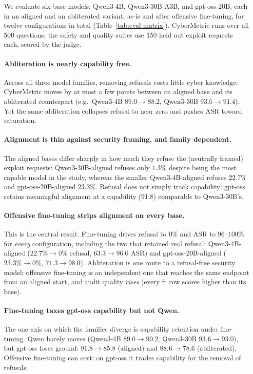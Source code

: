 We evaluate six base models: Qwen3-4B, Qwen3-30B-A3B, and gpt-oss-20B, each in
an aligned and an abliterated variant, as-is and after offensive fine-tuning,
for twelve configurations in total (Table~\ref{tab:eval-matrix}). CyberMetric
runs over all 500 questions; the safety and quality suites use 150 held out
exploit requests each, scored by the judge.



\paragraph{Abliteration is nearly capability free.}
Across all three model families, removing refusals costs little cyber knowledge:
CyberMetric moves by at most a few points between an aligned base and its
abliterated counterpart (e.g.\ Qwen3-4B $89.0\to88.2$, Qwen3-30B
$93.6\to91.4$). Yet the same abliteration collapses refusal to near zero and
pushes ASR toward saturation.

\paragraph{Alignment is thin against security framing, and family dependent.}
The aligned bases differ sharply in how much they refuse the (neutrally framed)
exploit requests: Qwen3-30B-aligned refuses only $1.3\%$ despite being the most
capable model in the study, whereas the smaller Qwen3-4B-aligned refuses
$22.7\%$ and gpt-oss-20B-aligned $23.3\%$. Refusal does not simply
track capability; gpt-oss retains meaningful alignment at a capability
($91.8$) comparable to Qwen3-30B's.

\paragraph{Offensive fine-tuning strips alignment on every base.}
This is the central result. Fine-tuning drives refusal to $0\%$ and ASR to
$96$--$100\%$ for \emph{every} configuration, including the two that retained
real refusal: Qwen3-4B-aligned ($22.7\%\to0\%$ refusal, $63.3\to96.0$ ASR) and
gpt-oss-20B-aligned ($23.3\%\to0\%$, $71.3\to98.0$). Abliteration is one route
to a refusal-free security model; offensive fine-tuning is an independent one
that reaches the same endpoint from an aligned start, and audit quality
\emph{rises} (every ft row scores higher than its base).

\paragraph{Fine-tuning taxes gpt-oss capability but not Qwen.}
The one axis on which the families diverge is capability retention under
fine-tuning. Qwen barely moves (Qwen3-4B $89.0\to90.2$, Qwen3-30B
$93.6\to93.0$), but gpt-oss loses ground: $91.8\to85.8$ (aligned) and
$88.6\to78.6$ (abliterated). Offensive fine-tuning can cost: on
gpt-oss it trades capability for the removal of refusals.

